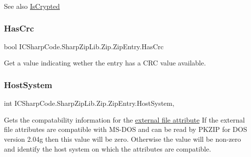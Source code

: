 \begin{DoxySeeAlso}{See also}
\hyperlink{class_i_c_sharp_code_1_1_sharp_zip_lib_1_1_zip_1_1_zip_entry_a3bb47622c085083f65c8d158633e2913}{Is\+Crypted}


\end{DoxySeeAlso}
\mbox{\label{class_i_c_sharp_code_1_1_sharp_zip_lib_1_1_zip_1_1_zip_entry_a90480b4b2826abfa24da8bb0e12b111e}} 
\subsubsection{\texorpdfstring{Has\+Crc}{HasCrc}}
{\footnotesize\ttfamily bool I\+C\+Sharp\+Code.\+Sharp\+Zip\+Lib.\+Zip.\+Zip\+Entry.\+Has\+Crc\hspace{0.3cm}{\ttfamily [get]}}



Get a value indicating wether the entry has a C\+RC value available. 

\mbox{\label{class_i_c_sharp_code_1_1_sharp_zip_lib_1_1_zip_1_1_zip_entry_a7fd80df84f1d8f6e8184816de2a5ebe2}} 
\subsubsection{\texorpdfstring{Host\+System}{HostSystem}}
{\footnotesize\ttfamily int I\+C\+Sharp\+Code.\+Sharp\+Zip\+Lib.\+Zip.\+Zip\+Entry.\+Host\+System\hspace{0.3cm}{\ttfamily [get]}, {\ttfamily [set]}}



Gets the compatability information for the \hyperlink{class_i_c_sharp_code_1_1_sharp_zip_lib_1_1_zip_1_1_zip_entry_a1e5dfa12a33a3b0a14dad39e7ec7d2cc}{external file attribute} If the external file attributes are compatible with M\+S-\/\+D\+OS and can be read by P\+K\+Z\+IP for D\+OS version 2.\+04g then this value will be zero. Otherwise the value will be non-\/zero and identify the host system on which the attributes are compatible. 

